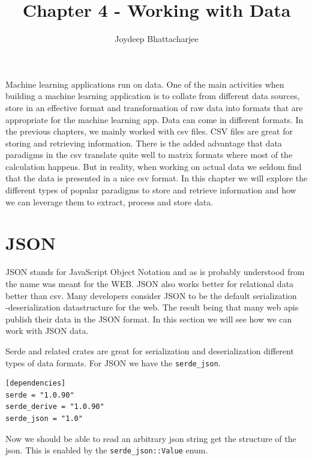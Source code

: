 \documentclass{book}
\begin{document}
\title{Chapter 4 - Working with Data}
\author {Joydeep Bhattacharjee}

\maketitle

Machine learning applications run on data. One of the main activities when building a machine learning application is to collate from different data sources, store in an effective format and transformation of raw data into formats that are appropriate for the machine learning app. Data can come in different formats. In the previous chapters, we mainly worked with csv files. CSV files are great for storing and retrieving information. There is the added advantage that data paradigms in the csv translate quite well to matrix formats where most of the calculation happens. But in reality, when working on actual data we seldom find that the data is presented in a nice csv format. In this chapter we will explore the different types of popular paradigms to store and retrieve information and how we can leverage them to extract, process and store data.

\section{JSON}%
JSON stands for JavaScript Object Notation and as is probably understood from the name was meant for the WEB. JSON also works better for relational data better than csv. Many developers consider JSON to be the default serialization\\-deserialization datastructure for the web. The result being that many web apis publish their data in the JSON format. In this section we will see how we can work with JSON data.

Serde and related crates are great for serialization and deserialization different types of data formats. For JSON we have the \lstinline{serde_json}.

\begin{lstlisting}[caption={chapter4\\/working\_with\_data\\/data\_formats\\/Cargo\\.toml},basicstyle=\small]
[dependencies]
serde = "1.0.90"
serde_derive = "1.0.90"
serde_json = "1.0"
\end{lstlisting}

Now we should be able to read an arbitrary json string get the structure of the json. This is enabled by the \lstinline{serde_json::Value} enum.
\end{document}
